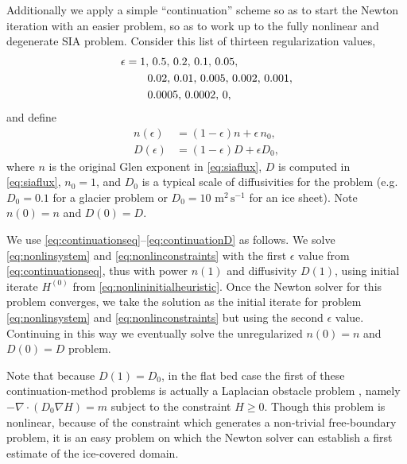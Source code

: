 \documentclass[twocolumn,letterpaper]{igs}
\newcommand{\Div}{\nabla\cdot}
\newcommand\eps{\epsilon}
\newcommand{\grad}{\nabla}
\begin{document}
Additionally we apply a simple ``continuation'' scheme \citep[compare][]{KelleyKeyes1998} so as to start the Newton iteration with an easier problem, so as to work up to the fully nonlinear and degenerate SIA problem.  Consider this list of thirteen regularization values,
\begin{align}
\eps &= 1,\, 0.5,\, 0.2,\, 0.1,\, 0.05, \label{eq:continuationseq} \\
     &\qquad 0.02,\, 0.01,\, 0.005,\, 0.002,\, 0.001, \notag \\
     &\qquad 0.0005,\, 0.0002,\, 0, \notag
\end{align}
and define
\begin{align}
n(\eps) &= (1-\eps) n + \eps\, n_0,  \label{eq:continuationn} \\
D(\eps) &= (1-\eps) D + \eps D_0,  \label{eq:continuationD}
\end{align}
where $n$ is the original Glen exponent in \eqref{eq:siaflux}, $D$ is computed in \eqref{eq:siaflux}, $n_0=1$, and $D_0$ is a typical scale of diffusivities for the problem (e.g.~$D_0=0.1$ for a glacier problem or $D_0=10$ $\text{m}^2\,\text{s}^{-1}$ for an ice sheet).  Note $n(0)=n$ and $D(0)=D$.

We use \eqref{eq:continuationseq}--\eqref{eq:continuationD} as follows.  We solve \eqref{eq:nonlinsystem} and \eqref{eq:nonlinconstraints} with the first $\eps$ value from \eqref{eq:continuationseq}, thus with power $n(1)$ and diffusivity $D(1)$, using initial iterate $H^{(0)}$ from \eqref{eq:nonlininitialheuristic}.  Once the Newton solver for this problem converges, we take the solution as the initial iterate for problem \eqref{eq:nonlinsystem} and \eqref{eq:nonlinconstraints} but using the second $\eps$ value.  Continuing in this way we eventually solve the unregularized $n(0)=n$ and $D(0)=D$ problem.

Note that because $D(1)=D_0$, in the flat bed case the first of these continuation-method problems is actually a Laplacian obstacle problem \citep{KinderlehrerStampacchia1980}, namely $-\Div(D_0 \grad H) = m$ subject to the constraint $H\ge 0$.  Though this problem is nonlinear, because of the constraint which generates a non-trivial free-boundary problem, it is an easy problem on which the Newton solver can establish a first estimate of the ice-covered domain.
\end{document}
